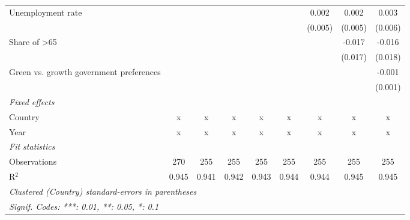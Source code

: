 \begin{table}[htbp]
\begin{tabular}{lcccccccc}
      Unemployment rate                                           &         &         &         &         &         & 0.002   & 0.002   & 0.003\\   
                                                                  &         &         &         &         &         & (0.005) & (0.005) & (0.006)\\   
      Share of >65                                                &         &         &         &         &         &         & -0.017  & -0.016\\   
                                                                  &         &         &         &         &         &         & (0.017) & (0.018)\\   
      Green vs. growth government preferences                     &         &         &         &         &         &         &         & -0.001\\   
                                                                  &         &         &         &         &         &         &         & (0.001)\\   
      \emph{Fixed effects}\\
      Country                                                     & x       & x       & x       & x       & x       & x       & x       & x\\  
      Year                                                        & x       & x       & x       & x       & x       & x       & x       & x\\  
      \midrule \emph{Fit statistics}\\
      Observations                                                & 270     & 255     & 255     & 255     & 255     & 255     & 255     & 255\\  
      R$^2$                                                       & 0.945   & 0.941   & 0.942   & 0.943   & 0.944   & 0.944   & 0.945   & 0.945\\  
      \midrule
      \multicolumn{9}{l}{\emph{Clustered (Country) standard-errors in parentheses}}\\
      \multicolumn{9}{l}{\emph{Signif. Codes: ***: 0.01, **: 0.05, *: 0.1}}\\
   \end{tabular}
\end{table}



